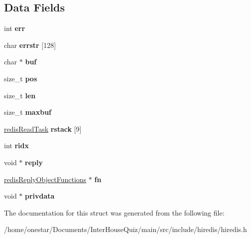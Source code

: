 \subsection*{Data Fields}
\begin{DoxyCompactItemize}
\item 
\hypertarget{structredis_reader_a6ce68847c12434f60d1b2654a3dc3409}{int {\bfseries err}}\label{structredis_reader_a6ce68847c12434f60d1b2654a3dc3409}

\item 
\hypertarget{structredis_reader_a653f7a6c1a0a77bb6917d6362aca8192}{char {\bfseries errstr} \mbox{[}128\mbox{]}}\label{structredis_reader_a653f7a6c1a0a77bb6917d6362aca8192}

\item 
\hypertarget{structredis_reader_a1fe855c208bc17a51a4d34fefdb2d5b1}{char $\ast$ {\bfseries buf}}\label{structredis_reader_a1fe855c208bc17a51a4d34fefdb2d5b1}

\item 
\hypertarget{structredis_reader_a5438a597ee291f523ae04a9fe355924f}{size\+\_\+t {\bfseries pos}}\label{structredis_reader_a5438a597ee291f523ae04a9fe355924f}

\item 
\hypertarget{structredis_reader_a7360b55975153b822efc5217b7734e6a}{size\+\_\+t {\bfseries len}}\label{structredis_reader_a7360b55975153b822efc5217b7734e6a}

\item 
\hypertarget{structredis_reader_adbd5150670d0b22a04e32af90803ea1d}{size\+\_\+t {\bfseries maxbuf}}\label{structredis_reader_adbd5150670d0b22a04e32af90803ea1d}

\item 
\hypertarget{structredis_reader_a80878c24e55fad06687b7a4b033d6248}{\hyperlink{structredis_read_task}{redis\+Read\+Task} {\bfseries rstack} \mbox{[}9\mbox{]}}\label{structredis_reader_a80878c24e55fad06687b7a4b033d6248}

\item 
\hypertarget{structredis_reader_a9ffabb366283fe1bb5a23e9b30613b6f}{int {\bfseries ridx}}\label{structredis_reader_a9ffabb366283fe1bb5a23e9b30613b6f}

\item 
\hypertarget{structredis_reader_a3054b93eacc586713f60fe72fc620146}{void $\ast$ {\bfseries reply}}\label{structredis_reader_a3054b93eacc586713f60fe72fc620146}

\item 
\hypertarget{structredis_reader_aa86f884032763563edf3234f512ddebf}{\hyperlink{structredis_reply_object_functions}{redis\+Reply\+Object\+Functions} $\ast$ {\bfseries fn}}\label{structredis_reader_aa86f884032763563edf3234f512ddebf}

\item 
\hypertarget{structredis_reader_ac5df247494dd66a10946e2d67e56b2a1}{void $\ast$ {\bfseries privdata}}\label{structredis_reader_ac5df247494dd66a10946e2d67e56b2a1}

\end{DoxyCompactItemize}


The documentation for this struct was generated from the following file\+:\begin{DoxyCompactItemize}
\item 
/home/onestar/\+Documents/\+Inter\+House\+Quiz/main/src/include/hiredis/hiredis.\+h\end{DoxyCompactItemize}
